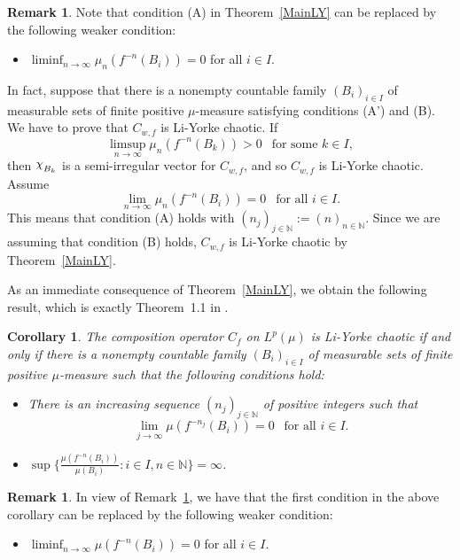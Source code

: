 \documentclass[12pt]{amsart}
\theoremstyle{theorem}
\newtheorem{corollary}[theorem]{Corollary}
\theoremstyle{definition}
\newtheorem{remark}[theorem]{Remark}
\theoremstyle{remark} \theoremstyle{question} \theoremstyle{example}
\newcommand{\N}{\mathbb{N}}
\DeclareRobustCommand{\rchi}{{\mathpalette\irchi\relax}}
\newcommand{\irchi}[2]{\raisebox{\depth}{$#1\chi$}}
\begin{document}
\begin{remark}\label{RemarkLY1}
Note that condition (A) in Theorem~\ref{MainLY} can be replaced by the following weaker condition:
\begin{itemize}
\item [\rm (A')] $\displaystyle \liminf_{n \to \infty} \mu_n(f^{-n}(B_i)) = 0$ for all $i \in I$.
\end{itemize}
In fact, suppose that there is a nonempty countable family $(B_i)_{i \in I}$ of measurable sets of finite positive $\mu$-measure satisfying conditions (A') and (B). We have to prove that $C_{w,f}$ is Li-Yorke chaotic. If
\[
\limsup_{n \to \infty} \mu_n(f^{-n}(B_k)) > 0 \ \ \text{ for some } k \in I,
\]
then $\rchi_{B_k}$ is a semi-irregular vector for $C_{w,f}$, and so $C_{w,f}$ is Li-Yorke chaotic. Assume
\[
\lim_{n \to \infty} \mu_n(f^{-n}(B_i)) = 0 \ \ \text{ for all } i \in I.
\]
This means that condition (A) holds with $(n_j)_{j \in \N}\!:= (n)_{n \in \N}$. 
Since we are assuming that condition (B) holds, $C_{w,f}$ is Li-Yorke chaotic by Theorem~\ref{MainLY}.
\end{remark}

As an immediate consequence of Theorem~\ref{MainLY}, we obtain the following result, which is exactly Theorem~1.1 in \cite{BerDarPir20}.

\begin{corollary}\label{CorLY1}
The composition operator $C_f$ on $L^p(\mu)$ is Li-Yorke chaotic if and only if there is a nonempty countable family $(B_i)_{i \in I}$ of measurable sets of finite positive $\mu$-measure such that the following conditions hold:
\begin{itemize}
\item There is an increasing sequence $(n_j)_{j \in \N}$ of positive integers such that
\[
\lim_{j \to \infty} \mu(f^{-n_j}(B_i)) = 0 \ \ \text{ for all } i \in I.
\]
\item $\displaystyle \sup\Bigg\{\frac{\mu(f^{-n}(B_i))}{\mu(B_i)} : i \in I, n \in \N\Bigg\} = \infty$.
\end{itemize}
\end{corollary}

\begin{remark}\label{RemarkLY2}
In view of Remark~\ref{RemarkLY1}, we have that the first condition in the above corollary can be replaced by the following weaker condition:
\begin{itemize}
\item $\displaystyle \liminf_{n \to \infty} \mu(f^{-n}(B_i)) = 0$ for all $i \in I$.
\end{itemize}
\end{remark}
\end{document}
